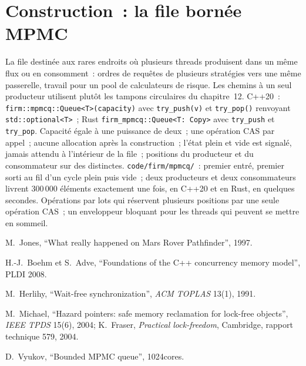 \section{Construction~: la file bornée MPMC}\label{bld:ll:lock-free-programming:mpmcq}

\begin{build}
 La file destinée aux rares endroits où plusieurs threads produisent dans un même flux ou en consomment~: ordres
de requêtes de plusieurs stratégies vers une même passerelle, travail pour un pool de calculateurs de risque. Les chemins à un seul producteur utilisent
plutôt les tampons circulaires du chapitre~12.
 C++20~: \texttt{firm::mpmcq::Queue<T>(capacity)} avec \texttt{try\_push(v)} et \texttt{try\_pop()} renvoyant
\texttt{std::optional<T>}~; Rust \texttt{firm\_mpmcq::Queue<T: Copy>} avec \texttt{try\_push} et \texttt{try\_pop}.
 Capacité égale à une puissance de deux~; une opération CAS par appel~; aucune allocation après la construction~; l'état plein et vide
est signalé, jamais attendu à l'intérieur de la file~; positions du producteur et du consommateur sur des  distinctes.
 \texttt{code/firm/mpmcq/}~: premier entré, premier sorti au fil d'un cycle plein puis vide~; deux producteurs et deux
consommateurs livrent 300\,000 éléments exactement une fois, en C++20 et en Rust, en quelques secondes.
 Opérations par lots qui réservent plusieurs positions par une seule opération CAS~; un enveloppeur bloquant pour les threads qui
peuvent se mettre en sommeil.
\end{build}

\begin{omsources}
\item M.~Jones, ``What really happened on Mars Rover Pathfinder'', 1997.
\item H.-J.~Boehm et S.~Adve, ``Foundations of the C++ concurrency memory model'', PLDI 2008.
\item M.~Herlihy, ``Wait-free synchronization'', \emph{ACM TOPLAS} 13(1), 1991.
\item M.~Michael, ``Hazard pointers: safe memory reclamation for lock-free objects'', \emph{IEEE TPDS} 15(6), 2004;
K.~Fraser, \emph{Practical lock-freedom}, Cambridge, rapport technique 579, 2004.
\item D.~Vyukov, ``Bounded MPMC queue'', 1024cores.
\end{omsources}

